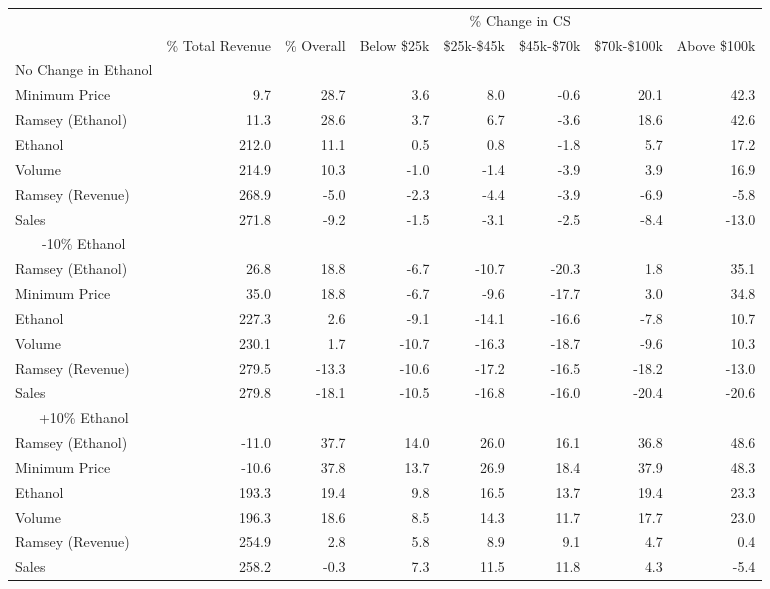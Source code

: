 \begin{tabular}{l r |r  rrrrr} 
\toprule 
\multicolumn{2}{c|}{}& \multicolumn{6}{c}{\% Change in CS} \\ 
& \% Total Revenue &  \% Overall &  Below \$25k & \$25k-\$45k &  \$45k-\$70k & \$70k-\$100k & Above \$100k \\ 
\multicolumn{1}{c}{No Change in Ethanol}&&&&&&& \\ 
\cmidrule(lr){1-1} \cmidrule(lrrrr){2-8} 

Minimum Price & 9.7 & 28.7 & 3.6 & 8.0 & -0.6 & 20.1 & 42.3 \\
Ramsey (Ethanol) & 11.3 & 28.6 & 3.7 & 6.7 & -3.6 & 18.6 & 42.6 \\
Ethanol & 212.0 & 11.1 & 0.5 & 0.8 & -1.8 & 5.7 & 17.2 \\
Volume & 214.9 & 10.3 & -1.0 & -1.4 & -3.9 & 3.9 & 16.9 \\
Ramsey (Revenue) & 268.9 & -5.0 & -2.3 & -4.4 & -3.9 & -6.9 & -5.8 \\
Sales & 271.8 & -9.2 & -1.5 & -3.1 & -2.5 & -8.4 & -13.0 \\
\midrule 
\multicolumn{1}{c}{-10\% Ethanol}&&&&&&& \\ 
\cmidrule(lr){1-1} \cmidrule(lrrrr){2-8} 

Ramsey (Ethanol) & 26.8 & 18.8 & -6.7 & -10.7 & -20.3 & 1.8 & 35.1 \\
Minimum Price & 35.0 & 18.8 & -6.7 & -9.6 & -17.7 & 3.0 & 34.8 \\
Ethanol & 227.3 & 2.6 & -9.1 & -14.1 & -16.6 & -7.8 & 10.7 \\
Volume & 230.1 & 1.7 & -10.7 & -16.3 & -18.7 & -9.6 & 10.3 \\
Ramsey (Revenue) & 279.5 & -13.3 & -10.6 & -17.2 & -16.5 & -18.2 & -13.0 \\
Sales & 279.8 & -18.1 & -10.5 & -16.8 & -16.0 & -20.4 & -20.6 \\
\midrule 
\multicolumn{1}{c}{+10\% Ethanol}&&&&&&& \\ 
\cmidrule(lr){1-1} \cmidrule(lrrrr){2-8} 

Ramsey (Ethanol) & -11.0 & 37.7 & 14.0 & 26.0 & 16.1 & 36.8 & 48.6 \\
Minimum Price & -10.6 & 37.8 & 13.7 & 26.9 & 18.4 & 37.9 & 48.3 \\
Ethanol & 193.3 & 19.4 & 9.8 & 16.5 & 13.7 & 19.4 & 23.3 \\
Volume & 196.3 & 18.6 & 8.5 & 14.3 & 11.7 & 17.7 & 23.0 \\
Ramsey (Revenue) & 254.9 & 2.8 & 5.8 & 8.9 & 9.1 & 4.7 & 0.4 \\
Sales & 258.2 & -0.3 & 7.3 & 11.5 & 11.8 & 4.3 & -5.4 \\
\bottomrule 
\end{tabular}